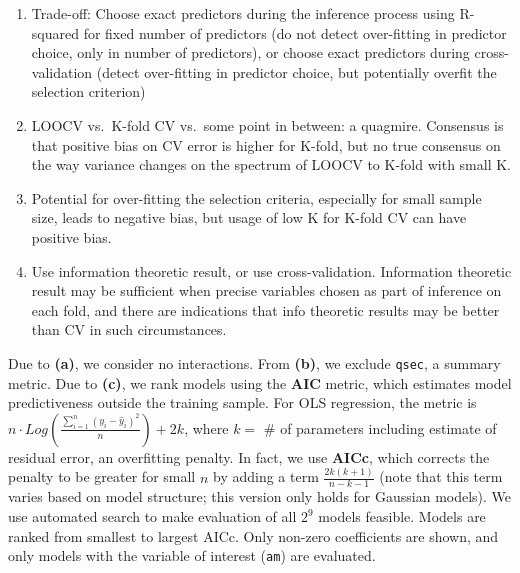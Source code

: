 \documentclass[]{article}
\providecommand{\tightlist}{%
  \setlength{\itemsep}{0pt}\setlength{\parskip}{0pt}}
\begin{document}
\begin{enumerate}
\def\labelenumi{\arabic{enumi}.}
\tightlist
\item
  Trade-off: Choose exact predictors during the inference process using
  R-squared for fixed number of predictors (do not detect over-fitting
  in predictor choice, only in number of predictors), or choose exact
  predictors during cross-validation (detect over-fitting in predictor
  choice, but potentially overfit the selection criterion)
\item
  LOOCV vs.~K-fold CV vs.~some point in between: a quagmire. Consensus
  is that positive bias on CV error is higher for K-fold, but no true
  consensus on the way variance changes on the spectrum of LOOCV to
  K-fold with small K.
\item
  Potential for over-fitting the selection criteria, especially for
  small sample size, leads to negative bias, but usage of low K for
  K-fold CV can have positive bias.
\item
  Use information theoretic result, or use cross-validation. Information
  theoretic result may be sufficient when precise variables chosen as
  part of inference on each fold, and there are indications that info
  theoretic results may be better than CV in such circumstances.
\end{enumerate}

Due to \textbf{(a)}, we consider no interactions. From \textbf{(b)}, we
exclude \texttt{qsec}, a summary metric. Due to \textbf{(c)}, we rank
models using the \textbf{AIC} metric, which estimates model
predictiveness outside the training sample. For OLS regression, the
metric is
\(n\cdot Log(\frac{\sum_{i=1}^n(y_{i}- \hat{y}_{i})^2}{n}) + 2k\), where
\(k =\) \# of parameters including estimate of residual error, an
overfitting penalty. In fact, we use \textbf{AICc}, which corrects the
penalty to be greater for small \(n\) by adding a term
\(\frac{2k(k + 1)}{{n}-{k}-1}\) (note that this term varies based on
model structure; this version only holds for Gaussian models). We use
automated search to make evaluation of all \(2^9\) models feasible.
Models are ranked from smallest to largest AICc. Only non-zero
coefficients are shown, and only models with the variable of interest
(\texttt{am}) are evaluated.
\end{document}
